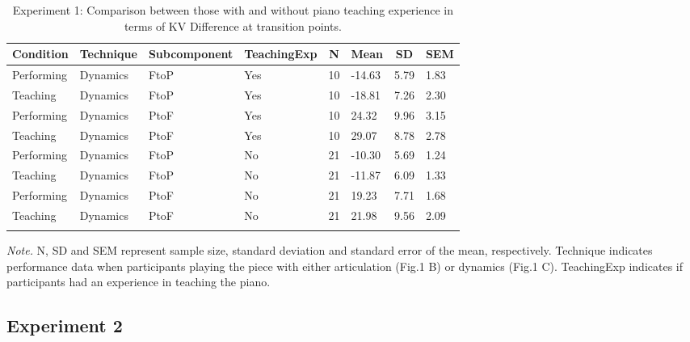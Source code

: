 \documentclass[
  man,floatsintext]{apa6}
\begin{document}
\begin{table}[tbp]

\begin{center}
\begin{threeparttable}

\caption{\label{tab:dyn-diff-teaching-desc-1}Experiment 1: Comparison between those with and without piano teaching experience in terms of KV Difference at transition points.}

\begin{tabular}{llllllll}
\toprule
Condition & \multicolumn{1}{c}{Technique} & \multicolumn{1}{c}{Subcomponent} & \multicolumn{1}{c}{TeachingExp} & \multicolumn{1}{c}{N} & \multicolumn{1}{c}{Mean} & \multicolumn{1}{c}{SD} & \multicolumn{1}{c}{SEM}\\
\midrule
Performing & Dynamics & FtoP & Yes & 10 & -14.63 & 5.79 & 1.83\\
Teaching & Dynamics & FtoP & Yes & 10 & -18.81 & 7.26 & 2.30\\
Performing & Dynamics & PtoF & Yes & 10 & 24.32 & 9.96 & 3.15\\
Teaching & Dynamics & PtoF & Yes & 10 & 29.07 & 8.78 & 2.78\\
Performing & Dynamics & FtoP & No & 21 & -10.30 & 5.69 & 1.24\\
Teaching & Dynamics & FtoP & No & 21 & -11.87 & 6.09 & 1.33\\
Performing & Dynamics & PtoF & No & 21 & 19.23 & 7.71 & 1.68\\
Teaching & Dynamics & PtoF & No & 21 & 21.98 & 9.56 & 2.09\\
\bottomrule
\addlinespace
\end{tabular}

\begin{tablenotes}[para]
\normalsize{\textit{Note.} N, SD and SEM represent sample size, standard deviation and standard error of the mean, respectively. Technique indicates performance data when participants playing the piece with either articulation (Fig.1 B) or dynamics (Fig.1 C). TeachingExp indicates if participants had an experience in teaching the piano.}
\end{tablenotes}

\end{threeparttable}
\end{center}

\end{table}

\clearpage

\hypertarget{experiment-2-2}{%
\subsection{Experiment 2}\label{experiment-2-2}}
\end{document}
